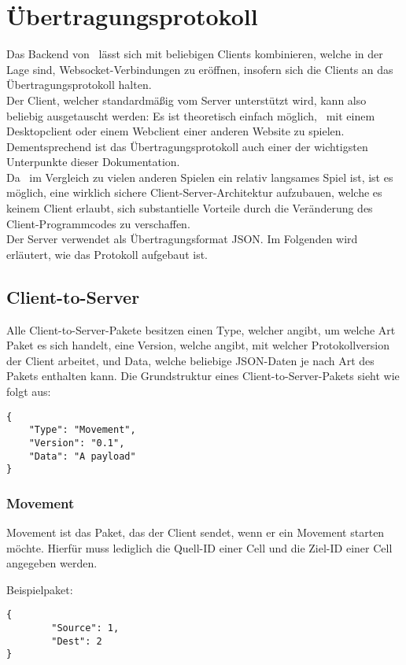 \section{Übertragungsprotokoll}
\lstset{style=json}
Das Backend von \vires\ lässt sich mit beliebigen Clients kombinieren, welche in der Lage sind, Websocket-Verbindungen zu eröffnen,
insofern sich die Clients an das Übertragungsprotokoll halten. \\
Der Client, welcher standardmäßig vom Server unterstützt wird, kann also beliebig ausgetauscht werden:
Es ist theoretisch einfach möglich, \vires\ mit einem Desktopclient oder einem Webclient einer anderen Website zu spielen.
Dementsprechend ist das Übertragungsprotokoll auch einer der wichtigsten Unterpunkte dieser Dokumentation. \\
Da \vires\ im Vergleich zu vielen anderen Spielen ein relativ langsames Spiel ist, ist es möglich, 
eine wirklich sichere Client-Server-Architektur aufzubauen, welche es keinem Client erlaubt, sich
substantielle Vorteile durch die Veränderung des Client-Programmcodes zu verschaffen. \\
Der Server verwendet als Übertragungsformat JSON.
Im Folgenden wird erläutert, wie das Protokoll aufgebaut ist.

\subsection{Client-to-Server}
Alle Client-to-Server-Pakete besitzen einen Type, welcher angibt, um welche Art Paket es sich handelt, eine Version, welche angibt, mit welcher Protokollversion der Client arbeitet, und Data, welche beliebige JSON-Daten je nach Art des Pakets enthalten kann. Die Grundstruktur eines Client-to-Server-Pakets sieht wie folgt aus:
\begin{lstlisting}
{
    "Type": "Movement",
    "Version": "0.1",
    "Data": "A payload"
}
\end{lstlisting}

\subsubsection{Movement}
Movement ist das Paket, das der Client sendet, wenn er ein Movement starten möchte. Hierfür muss lediglich die Quell-ID einer Cell und die Ziel-ID einer Cell angegeben werden.

Beispielpaket:
\begin{lstlisting}
{
        "Source": 1,
        "Dest": 2
}
\end{lstlisting}

